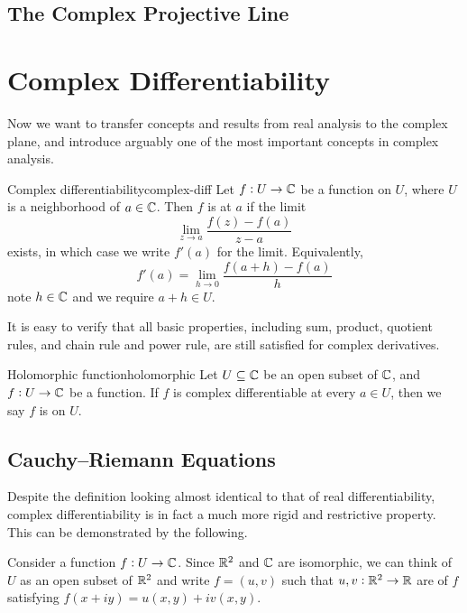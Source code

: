 \documentclass{styles/tufte}
\begin{document}
\subsection{The Complex Projective Line}



\section{Complex Differentiability}

Now we want to transfer concepts and results from real analysis to the complex plane, and introduce arguably one of the most important concepts in complex analysis.

\begin{definition}{Complex differentiability}{complex-diff}
  Let $f: U \to \mathbb{C}$ be a function on $U$, where $U$ is a neighborhood of $a \in \mathbb{C}$. Then $f$ is  at $a$ if the limit
  \[ \lim_{z \to a} \frac{f(z) - f(a)}{z - a} \]
  exists, in which case we write $f'(a)$ for the limit. Equivalently,
  \[ f'(a) = \lim_{h \to 0} \frac{f(a + h) - f(a)}{h} \]
  note $h \in \mathbb{C}$ and we require $a + h \in U$.
\end{definition}

It is easy to verify that all basic properties, including sum, product, quotient rules, and chain rule and power rule, are still satisfied for complex derivatives.

\begin{definition}{Holomorphic function}{holomorphic}
  Let $U \subseteq \mathbb{C}$ be an open subset of $\mathbb{C}$, and $f: U \to \mathbb{C}$ be a function. If $f$ is complex differentiable at every $a \in U$, then we say $f$ is  on $U$.
\end{definition}


\subsection{Cauchy--Riemann Equations}

  Despite the definition looking almost identical to that of real differentiability, complex differentiability is in fact a much more rigid and restrictive property. This can be demonstrated by the following.

  Consider a function $f: U \to \mathbb{C}$. Since $\mathbb{R}^2$ and $\mathbb{C}$ are isomorphic, we can think of $U$ as an open subset of $\mathbb{R}^2$ and write $f = (u, v)$ such that $u, v: \mathbb{R}^2 \to \mathbb{R}$ are  of $f$ satisfying $f(x + iy) = u(x, y) + iv(x, y)$.
  
\end{document}
